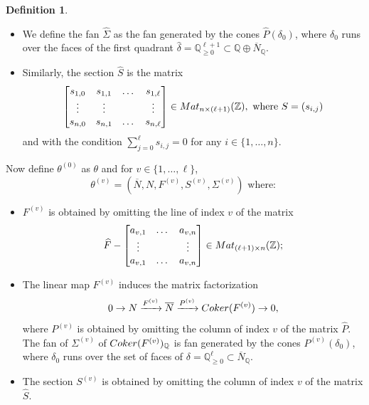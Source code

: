 \documentclass[11pt, reqno]{amsart}
\theoremstyle{plain}
\theoremstyle{definition}
\newtheorem{definition}[theorem]{Definition}
\theoremstyle{remark}
\begin{document}
\begin{definition}
\begin{itemize}
$$0\rightarrow N\xrightarrow{\widehat{F}}\mathbb{Z}\oplus \overline{N}\xrightarrow{\widehat{P}} {\rm Coker}(F) =  {\rm Coker}(\widehat{F})\rightarrow 0.$$
\item[(2)] We define the fan $\widehat{\Sigma}$ as the fan generated by the cones $\widehat{P}(\delta_{0})$, where $\delta_{0}$ runs over the faces of the first quadrant $\widehat{\delta} =  \mathbb{Q}^{\ell+1}_{\geq 0}\subset\mathbb{Q}\oplus \overline{N}_{\mathbb{Q}}$. 
\item[(3)] Similarly, the section $\widehat{S}$ is the matrix 
$$\begin{bmatrix} 
    s_{1,0} & s_{1,1} & \dots & s_{1, \ell}\\
    \vdots &  \vdots &     & \vdots  \\
    s_{n,0} & s_{n,1} & \dots & s_{n, \ell}
    \end{bmatrix}\in {\rm Mat}_{n\times (\ell + 1)}(\mathbb{Z}), \text{ where } S =  (s_{i,j})$$
and with the condition $\sum_{j = 0}^{\ell}s_{i,j} =  0$ for any $i\in \{1, \ldots, n\}$.
\end{itemize}
Now define $\theta^{(0)}$ as $\theta$ and for $v\in \{1, \ldots, \ell\}$,
$$\theta^{(v)} =  (\overline{N}, N, F^{(v)}, S^{(v)}, \Sigma^{(v)}) \text{ where: }$$
\begin{itemize}
\item[(I)] $F^{(v)}$ is obtained by omitting the line of index $v$ of the matrix 
$$\widehat{F}  -  \begin{bmatrix} 
     a_{v,1} & \dots & a_{v, n}\\
      \vdots &     & \vdots  \\
     a_{v,1} & \dots & a_{v, n}
    \end{bmatrix}\in {\rm Mat}_{(\ell+1)\times n}(\mathbb{Z});$$
\item[(II)] The linear map $F^{(v)}$ induces the matrix factorization 
$$0\rightarrow N \xrightarrow{F^{(v)}} \overline{N}\xrightarrow{P^{(v)}}{\rm Coker}(F^{(v)})\rightarrow 0,$$
where $P^{(v)}$ is obtained by omitting the column of index $v$ of the matrix $\widehat{P}$. The fan of $\Sigma^{(v)}$ of ${\rm Coker}(F^{(v)})_{\mathbb{Q}}$ is fan generated by the cones $P^{(v)}(\delta_{0})$, where $\delta_{0}$ runs over the set of faces of $\delta =  \mathbb{Q}_{\geq 0}^{\ell}\subset\overline{N}_{\mathbb{Q}}$.
\item[(III)] The section $S^{(v)}$ is obtained by omitting the column of index $v$ of the matrix $\widehat{S}$.
\end{itemize}
\end{definition}
\end{document}

